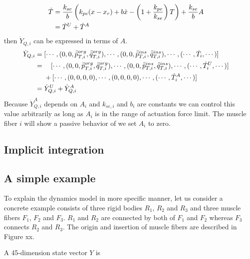 \documentclass[a4paper,10pt]{article}
\begin{document}
\begin{align}
\dot{T} = {} &   \frac{k_{se}}{b} \left( k_{pe}(x-x_{r})+b\dot{x}-\left(1+\frac{k_{pe}}{k_{se}}\right)T \right)
               + \frac{k_{se}}{b}A\notag\\
        = {} & \dot{T}^U + \dot{T}^A\label{TensionLinear}
\end{align}
then $\dot{Y}_{Q,i}$ can be expressed in terms of $A$.
\begin{align}
\dot{Y}_{Q,i} = {} & [ \cdots , (0, 0, \ddot{\bar{p}}_{T,i}^{org}, \ddot{\bar{q}}_{T,i}^{org}),
                       \cdots , (0, 0, \ddot{\bar{p}}_{T,i}^{ins}, \ddot{\bar{q}}_{T,i}^{ins}),
                       \cdots , (\cdots , \dot{T}_i, \cdots )]\notag\\
              = {} & \quad[ \cdots , (0, 0, \ddot{\bar{p}}_{T,i}^{org}, \ddot{\bar{q}}_{T,i}^{org}),
                       \cdots , (0, 0, \ddot{\bar{p}}_{T,i}^{ins}, \ddot{\bar{q}}_{T,i}^{ins}),
                       \cdots , (\cdots , \dot{T}_i^U, \cdots )]\notag\\
                   &+[ \cdots , (0, 0, 0, 0),
                       \cdots , (0, 0, 0, 0),
                       \cdots , (\cdots , \dot{T}_i^A, \cdots )]\notag\\
              = {} & \dot{Y}_{Q,i}^U + \dot{Y}_{Q,i}^A\label{ActuationForceRevealed}
\end{align}
Because $\dot{Y}_{Q,i}^A$ depends on $A_i$ and $k_{se,i}$ and $b_i$ are constants
we can control this value arbitrarily as long as $A_i$ is in the range of
actuation force limit.
The muscle fiber $i$ will show a passive behavior of we set $A_i$ to zero.

\subsection{Implicit integration}

\subsection{A simple example}

To explain the dynamics model in more specific manner, let us consider
a concrete example consists of three rigid bodies $R_1$, $R_2$ and $R_3$
and three muscle fibers $F_1$, $F_2$ and $F_3$. $R_1$ and $R_2$ are connected
by both of $F_1$ and $F_2$ whereas $F_3$ connects $R_2$ and $R_3$. The
origin and insertion of muscle fibers are described in Figure xx.

A 45-dimension state vector $Y$ is
\end{document}
